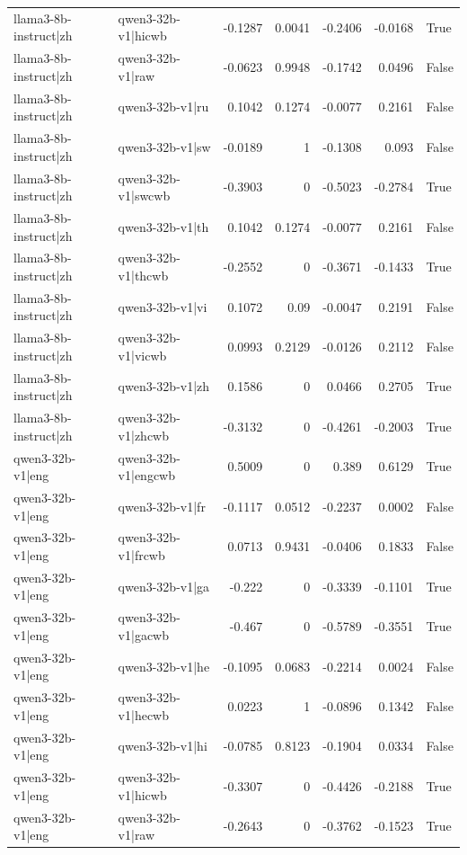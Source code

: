 \begin{table}
\begin{tabular}{l l r r r r l}
llama3-8b-instruct|zh & qwen3-32b-v1|hicwb & -0.1287 & 0.0041 & -0.2406 & -0.0168 & True \\
llama3-8b-instruct|zh & qwen3-32b-v1|raw & -0.0623 & 0.9948 & -0.1742 & 0.0496 & False \\
llama3-8b-instruct|zh & qwen3-32b-v1|ru & 0.1042 & 0.1274 & -0.0077 & 0.2161 & False \\
llama3-8b-instruct|zh & qwen3-32b-v1|sw & -0.0189 & 1 & -0.1308 & 0.093 & False \\
llama3-8b-instruct|zh & qwen3-32b-v1|swcwb & -0.3903 & 0 & -0.5023 & -0.2784 & True \\
llama3-8b-instruct|zh & qwen3-32b-v1|th & 0.1042 & 0.1274 & -0.0077 & 0.2161 & False \\
llama3-8b-instruct|zh & qwen3-32b-v1|thcwb & -0.2552 & 0 & -0.3671 & -0.1433 & True \\
llama3-8b-instruct|zh & qwen3-32b-v1|vi & 0.1072 & 0.09 & -0.0047 & 0.2191 & False \\
llama3-8b-instruct|zh & qwen3-32b-v1|vicwb & 0.0993 & 0.2129 & -0.0126 & 0.2112 & False \\
llama3-8b-instruct|zh & qwen3-32b-v1|zh & 0.1586 & 0 & 0.0466 & 0.2705 & True \\
llama3-8b-instruct|zh & qwen3-32b-v1|zhcwb & -0.3132 & 0 & -0.4261 & -0.2003 & True \\
qwen3-32b-v1|eng & qwen3-32b-v1|engcwb & 0.5009 & 0 & 0.389 & 0.6129 & True \\
qwen3-32b-v1|eng & qwen3-32b-v1|fr & -0.1117 & 0.0512 & -0.2237 & 0.0002 & False \\
qwen3-32b-v1|eng & qwen3-32b-v1|frcwb & 0.0713 & 0.9431 & -0.0406 & 0.1833 & False \\
qwen3-32b-v1|eng & qwen3-32b-v1|ga & -0.222 & 0 & -0.3339 & -0.1101 & True \\
qwen3-32b-v1|eng & qwen3-32b-v1|gacwb & -0.467 & 0 & -0.5789 & -0.3551 & True \\
qwen3-32b-v1|eng & qwen3-32b-v1|he & -0.1095 & 0.0683 & -0.2214 & 0.0024 & False \\
qwen3-32b-v1|eng & qwen3-32b-v1|hecwb & 0.0223 & 1 & -0.0896 & 0.1342 & False \\
qwen3-32b-v1|eng & qwen3-32b-v1|hi & -0.0785 & 0.8123 & -0.1904 & 0.0334 & False \\
qwen3-32b-v1|eng & qwen3-32b-v1|hicwb & -0.3307 & 0 & -0.4426 & -0.2188 & True \\
qwen3-32b-v1|eng & qwen3-32b-v1|raw & -0.2643 & 0 & -0.3762 & -0.1523 & True \\

\end{tabular}
\end{table}
